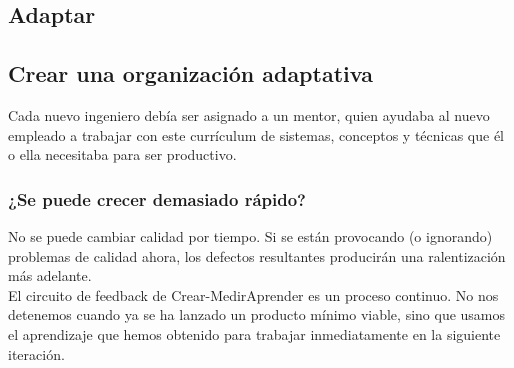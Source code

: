 \documentclass[10pt]{article}
\begin{document}
\begin{multicols}{2}
\section*{Adaptar}
\subsection*{Crear una organización adaptativa}
Cada nuevo ingeniero debía ser asignado a un mentor, quien ayudaba al nuevo empleado a trabajar con este currículum de sistemas, conceptos y técnicas que él o ella necesitaba para ser productivo.
\subsubsection*{¿Se puede crecer demasiado rápido?}
No se puede cambiar calidad por tiempo. Si se están provocando (o ignorando) problemas de calidad ahora, los defectos resultantes producirán una ralentización más adelante. \\
El circuito de feedback de Crear-MedirAprender es un proceso continuo. No nos detenemos cuando ya se ha lanzado un producto mínimo viable, sino que usamos el aprendizaje que hemos obtenido para trabajar inmediatamente en la siguiente iteración. 

\end{multicols}
\end{document}
